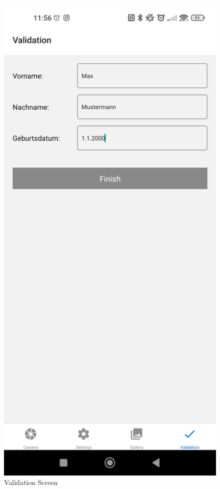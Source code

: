 \begin{figure}
    \centering
    \includegraphics[scale=0.2]{pics/ValidationScreen.jpg}
    \caption{Validation Screen}
    \label{fig:impl:validationscreen}
\end{figure}

